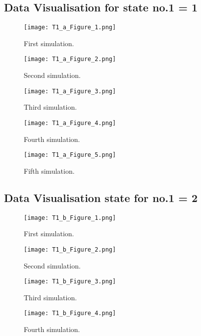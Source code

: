 \documentclass[a4paper]{article}
\begin{document}
\subsection{Data Visualisation for state no.1 = 1}

\begin{figure}[H]
\centering
\texttt{[image: T1\_a\_Figure\_1.png]}
\caption{\label{fig:table}First simulation.}
\end{figure}
\begin{figure}[H]
\centering
\texttt{[image: T1\_a\_Figure\_2.png]}
\caption{\label{fig:table}Second simulation.}
\end{figure}

\begin{figure}[H]
\centering
\texttt{[image: T1\_a\_Figure\_3.png]}
\caption{\label{fig:table}Third simulation.}
\end{figure}

\begin{figure}[H]
\centering
\texttt{[image: T1\_a\_Figure\_4.png]}
\caption{\label{fig:table}Fourth simulation.}
\end{figure}

\begin{figure}[H]
\centering
\texttt{[image: T1\_a\_Figure\_5.png]}
\caption{\label{fig:table}Fifth simulation.}
\end{figure}

\subsection{Data Visualisation state for no.1 = 2}

\begin{figure}[H]
\centering
\texttt{[image: T1\_b\_Figure\_1.png]}
\caption{\label{fig:table}First simulation.}
\end{figure}
\begin{figure}[H]
\centering
\texttt{[image: T1\_b\_Figure\_2.png]}
\caption{\label{fig:table}Second simulation.}
\end{figure}

\begin{figure}[H]
\centering
\texttt{[image: T1\_b\_Figure\_3.png]}
\caption{\label{fig:table}Third simulation.}
\end{figure}

\begin{figure}[H]
\centering
\texttt{[image: T1\_b\_Figure\_4.png]}
\caption{\label{fig:table}Fourth simulation.}
\end{figure}
\end{document}
